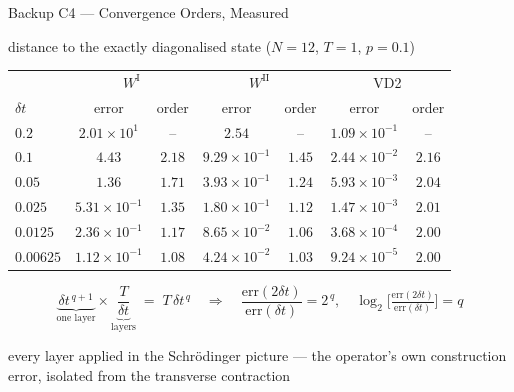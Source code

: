 \documentclass[aspectratio=169,11pt]{beamer}
\begin{document}
\begin{frame}{Backup C4 --- Convergence Orders, Measured}
  \begin{center}\small
    distance to the exactly diagonalised state ($N=12$, $T=1$, $p=0.1$)
  \end{center}
  \begin{center}
    \setlength{\tabcolsep}{5pt}\renewcommand{\arraystretch}{1.0}\small
    \begin{tabular}{lcccccc}
      \toprule
                 & \multicolumn{2}{c}{$W^{\mathrm{I}}$}
                 & \multicolumn{2}{c}{$W^{\mathrm{II}}$}
                 & \multicolumn{2}{c}{VD2}                                                                                          \\[-0.2ex]
      $\delta t$ & error                                 & order  & error                 & order  & error                 & order  \\
      \midrule
      $0.2$      & $2.01{\times}10^{1}$                  & --     & $2.54$                & --     & $1.09{\times}10^{-1}$ & --     \\
      $0.1$      & $4.43$                                & $2.18$ & $9.29{\times}10^{-1}$ & $1.45$ & $2.44{\times}10^{-2}$ & $2.16$ \\
      $0.05$     & $1.36$                                & $1.71$ & $3.93{\times}10^{-1}$ & $1.24$ & $5.93{\times}10^{-3}$ & $2.04$ \\
      $0.025$    & $5.31{\times}10^{-1}$                 & $1.35$ & $1.80{\times}10^{-1}$ & $1.12$ & $1.47{\times}10^{-3}$ & $2.01$ \\
      $0.0125$   & $2.36{\times}10^{-1}$                 & $1.17$ & $8.65{\times}10^{-2}$ & $1.06$ & $3.68{\times}10^{-4}$ & $2.00$ \\
      $0.00625$  & $1.12{\times}10^{-1}$                 & $1.08$ & $4.24{\times}10^{-2}$ & $1.03$ & $9.24{\times}10^{-5}$ & $2.00$ \\
      \bottomrule
    \end{tabular}
  \end{center}
  \vspace{-0.3em}
  \[
    \underbrace{\delta t^{\,q+1}}_{\text{one layer}}
    \times
    \underbrace{\frac{T}{\delta t}}_{\text{layers}}
    \;=\; T\,\delta t^{\,q}
    \quad\Longrightarrow\quad
    \frac{\mathrm{err}(2\delta t)}{\mathrm{err}(\delta t)} = 2^{\,q},
    \quad
    \log_2\!\Big[\tfrac{\mathrm{err}(2\delta t)}{\mathrm{err}(\delta t)}\Big] = q
  \]
  \vspace{-1.0em}
  \begin{center}\footnotesize\color{ink!70}
    every layer applied in the Schr\"odinger picture --- the operator's own
    construction error, isolated from the transverse contraction
  \end{center}
\end{frame}
\end{document}
